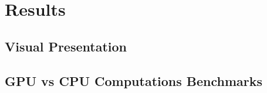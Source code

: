 \chapter{Results}

  \section {Visual Presentation} %
  \section {GPU vs CPU Computations Benchmarks}